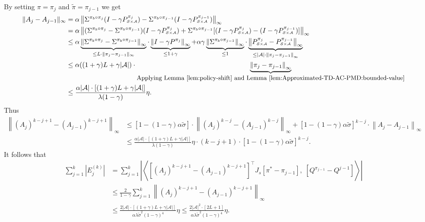 \documentclass[10pt]{article}
\newcommand{\calA}{\mathcal{A}}
\newcommand{\calS}{\mathcal{S}}
\newcommand{\ls}{\left}
\newcommand{\rs}{\right}
\newcommand{\inner}[2]{\ls\langle #1, \; #2 \rs\rangle}
\theoremstyle{plain}
\theoremstyle{definition}
\begin{document}
By setting $\pi = \pi_j$ and $\tilde\pi = \pi_{j-1}$ we get
\begin{align*}
    \| A_j - A_{j-1} \|_\infty &= \alpha \ls\| \Sigma^{\pi_b\circ\pi_j}(I - \gamma P^{\pi_j}_{\scriptscriptstyle\calS\times\calA}) - \Sigma^{\pi_b\circ\pi_{j-1}}(I - \gamma P^{\pi_{j-1}}_{\scriptscriptstyle\calS\times\calA}) \rs\|_\infty \\
    &= \alpha \ls\| (\Sigma^{\pi_b\circ\pi_j} - \Sigma^{\pi_b\circ\pi_{j-1}})(I - \gamma P^{\pi_j}_{\scriptscriptstyle\calS\times\calA}) + \Sigma^{\pi_b\circ\pi_{j-1}}[(I - \gamma P^{\pi_{j}}_{\scriptscriptstyle\calS\times\calA})-(I - \gamma P^{\pi_{j-1}}_{\scriptscriptstyle\calS\times\calA})] \rs\|_\infty \\
    &\leq \alpha \underbrace{\ls\|\Sigma^{\pi_b\circ\pi_j} - \Sigma^{\pi_b\circ\pi_{j-1}}\rs\|_\infty}_{\leq L\cdot \| \pi_j - \pi_{j-1} \|_\infty} \cdot \underbrace{\ls\| I - \gamma P^{\pi_{j}} \rs\|_\infty}_{\leq 1 + \gamma} + \alpha \gamma \underbrace{\ls\| \Sigma^{\pi_b\circ\pi_{j-1}} \rs\|_\infty}_{\leq 1} \cdot \underbrace{\ls\| P^{\pi_{j}}_{\scriptscriptstyle\calS\times\calA} - P^{\pi_{j-1}}_{\scriptscriptstyle\calS\times\calA} \rs\|_\infty}_{\leq |\calA| \cdot \ls\| \pi_j - \pi_{j-1} \rs\|_\infty} \\
    &\leq \alpha ((1+\gamma) L + \gamma |\calA|) \cdot \underbrace{\ls\| \pi_j - \pi_{j-1} \rs\|_\infty}_{\mbox{\small Applying Lemma~\ref{lem:policy-shift} and Lemma~\ref{lem:Approximated-TD-AC-PMD:bounded-value}}}  \\
    &\leq \frac{\alpha |\calA| \cdot \ls[ (1+\gamma) L + \gamma |\calA| \rs]}{\lambda (1-\gamma)} \eta.
\end{align*}
Thus
\begin{align*}
    \ls\| (A_j)^{k-j+1} - (A_{j-1})^{k-j+1} \rs\|_\infty &\leq [1-(1-\gamma)\alpha\tilde\sigma] \cdot \ls\| (A_j)^{k-j} - (A_{j-1})^{k-j} \rs\|_\infty + [1-(1-\gamma)\alpha\tilde\sigma]^{k-j} \cdot \ls\| A_j - A_{j-1} \rs\|_\infty \\
    &\leq \frac{\alpha |\calA| \cdot \ls[ (1+\gamma) L + \gamma |\calA| \rs]}{\lambda (1-\gamma)} \eta \cdot (k-j+1) \cdot [1-(1-\gamma)\alpha\tilde\sigma]^{k-j}.
\end{align*}
It follows that
\begin{align*}
    \sum_{j=1}^k \ls| E_j^{(k)} \rs| &= \sum_{j=1}^k \ls| \inner{\ls[ (A_{j})^{k-j+1} - (A_{j-1})^{k-j+1} \rs]^\top J_s [\pi^* - \pi_{j-1}]}{[Q^{\pi_{j-1}} - Q^{j-1}]} \rs| \\
    &\leq \frac{2}{1-\gamma} \sum_{j=1}^k \ls\| (A_j)^{k-j+1} - (A_{j-1})^{k-j+1} \rs\|_\infty \\
    &\leq \frac{2|\calA| \cdot \ls[ (1+\gamma) L + \gamma |\calA| \rs]}{\alpha\lambda\tilde\sigma^2 (1-\gamma)^4} \eta \leq \frac{2|\calA|^2 \cdot \ls[ 2 L +  1 \rs]}{\alpha\lambda\tilde\sigma^2 (1-\gamma)^4} \eta.
\end{align*}
\end{document}
